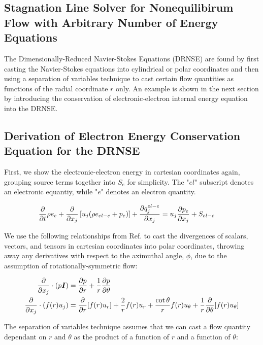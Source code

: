 \documentclass[10pt]{article}
\begin{document}
\begin{flushleft}
\newpage
\section{Stagnation Line Solver for Nonequilibirum Flow with Arbitrary Number of Energy Equations}

The Dimensionally-Reduced Navier-Stokes Equations (DRNSE) are found by first casting the Navier-Stokes equations into cylindrical or polar coordinates and then using a separation of variables technique to cast certain flow quantities as functions of the radial coordinate $r$ only. An example is shown in the next section by introducing the conservation of electronic-electron internal energy equation into the DRNSE.

\subsection{Derivation of Electron Energy Conservation Equation for the DRNSE}

First, we show the electronic-electron energy in cartesian coordinates again, grouping source terms together into $S_e$ for simplicity. The "$el$" subscript denotes an electronic equantiy, while "$e$" denotes an electron quantity.

\begin{equation*}
    \frac{\partial }{\partial t} \rho e_{e} + \frac{\partial }{\partial x_j} \left[ u_j(\rho e_{el-e} + p_e) \right] + \frac{\partial q_j^{el-e}}{\partial x_j} = u_j \frac{\partial p_e}{\partial x_j} + S_{el-e} \hspace{5mm}
\end{equation*}

We use the following relationships from Ref. \cite{klomfass1996} to cast the divergences of scalars, vectors, and tensors in cartesian coordinates into polar coordinates, throwing away any derivatives with respect to the aximuthal angle, $\phi$, due to the assumption of rotationally-symmetric flow:

\begin{equation}
\begin{aligned}
\frac{\partial }{\partial x_j} \cdot (p \boldsymbol{I}) &= \frac{\partial p}{\partial r} + \frac{1}{r} \frac{\partial p}{\partial \theta} \\
\frac{\partial }{\partial x_j} \cdot (f(r) u_j) &= \frac{\partial }{\partial r}[f(r) u_r] + \frac{2}{r} f(r) u_r + \frac{\cot \theta}{r} f(r) u_\theta + \frac{1}{r} \frac{\partial }{\partial \theta} [f(r) u_\theta]
\label{eq:polar_div}
\end{aligned}
\end{equation}

The separation of variables technique assumes that we can cast a flow quantity dependant on $r$ and $\theta$ as the product of a function of $r$ and a function of $\theta$:


\end{flushleft}
\end{document}
